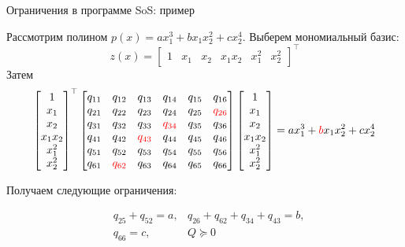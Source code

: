 \documentclass{beamer}
\begin{document}
\begin{frame}{Ограничения в программе SoS: пример}
	\begin{flushleft}
		
		Рассмотрим полином $p(x)=a x_1^3+b x_1x_2^2+c x_2^4$. Выберем мономиальный базис:		
		\[
		z(x)=
		\begin{bmatrix}
			1 &
			x_1 &
			x_2 &
			x_1x_2 &
			x_1^2 &
			x_2^2
		\end{bmatrix}^\top
		\]
		Затем
		\[
		\begin{bmatrix}
			1\\
			x_1\\
			x_2\\
			x_1x_2\\
			x_1^2\\
			x_2^2
		\end{bmatrix}^\top
		\begin{bmatrix}
			q_{11}&q_{12}&q_{13}&q_{14}&q_{15}&q_{16}\\
			q_{21}&q_{22}&q_{23}&q_{24}&q_{25}&\color{red}{q_{26}}\\
			q_{31}&q_{32}&q_{33}&\color{red}{q_{34}}&q_{35}&q_{36}\\
			q_{41}&q_{42}&\color{red}{q_{43}}&q_{44}&q_{45}&q_{46}\\
			q_{51}&q_{52}&q_{53}&q_{54}&q_{55}&q_{56}\\
			q_{61}&\color{red}{q_{62}}&q_{63}&q_{64}&q_{65}&q_{66}
		\end{bmatrix}
		\begin{bmatrix}
			1\\
			x_1\\
			x_2\\
			x_1x_2\\
			x_1^2\\
			x_2^2
		\end{bmatrix}
		=
		a x_1^3+\textcolor{red}{b}x_1 x_2^2 + c x_2^4
		\]
		
		Получаем следующие ограничения:
		
		\begin{align*}
			& q_{25} + q_{52} = a, & q_{26} + q_{62} + q_{34} + q_{43} = b, \\
			& q_{66} = c, & Q \succeq 0
		\end{align*}
		
	\end{flushleft}
\end{frame}
\end{document}
